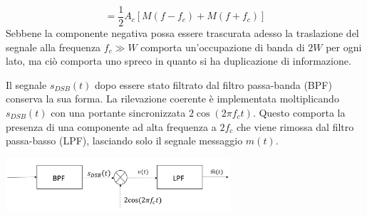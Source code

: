 \[
= \frac{1}{2} A_c [M(f - f_c) + M(f + f_c)]
\]
Sebbene la componente negativa possa essere trascurata adesso la traslazione del segnale alla frequenza $f_c \gg W$ comporta un'occupazione di banda di $2W$ per ogni lato, ma ciò comporta uno spreco in quanto si ha duplicazione di informazione. 

\begin{center}
\end{center}



Il segnale \( s_{DSB}(t) \) dopo essere stato filtrato dal filtro passa-banda (BPF) conserva la sua forma.
La rilevazione coerente è implementata moltiplicando \( s_{DSB}(t) \) con una portante sincronizzata \( 2\cos(2\pi f_c t) \).
Questo comporta la presenza di una componente ad alta frequenza a \( 2f_c \) che viene rimossa dal filtro passa-basso (LPF), lasciando solo il segnale messaggio \( m(t) \).
\begin{center}
    \includegraphics[width=0.625\textwidth]{imgs/analog_pam_receiver.png}
\end{center}

